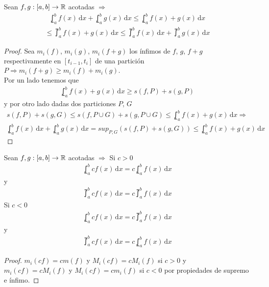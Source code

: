 \begin{prop}
  Sean \(f, g: [a, b] \to \mathbb{R}\) acotadas \(\Rightarrow\)
  \begin{align*}
    \lowint_a^b f(x)\,\mathrm{d}x + \lowint_a^b g(x)\,\mathrm{d}x \leq \lowint_a^b f(x)+g(x)\,\mathrm{d}x
  \end{align*}
  \begin{align*}
    \leq \upint_a^b f(x) + g(x)\, \mathrm{d}x \leq \upint_a^b f(x)\, \mathrm{d}x + \upint_a^b g(x)\, \mathrm{d}x
  \end{align*}
  \begin{proof}
    Sea \(m_i(f)\), \(m_i(g)\), \(m_i(f+g)\) los ínfimos de \(f\), \(g\), \(f+g\) respectivamente en \([t_{i-1}, t_i]\) de una partición \(P \Rightarrow m_i(f+g) \geq m_i(f) + m_i(g)\). \\
    Por un lado tenemos que \begin{align*}
      \lowint_a^b f(x)+g(x)\, \mathrm{d}x \geq s(f, P) + s(g, P)
    \end{align*} y por otro lado dadas dos particiones \(P\), \(G\) \begin{align*}
      s(f, P) + s(g, G) \leq s(f, P \cup G) + s(g, P \cup G) \leq \lowint_a^b f(x)+g(x)\,\mathrm{d}x \Rightarrow
    \end{align*}
    \begin{align*}
      \lowint_a^b f(x) \, \mathrm{d}x + \lowint_a^b g(x) \, \mathrm{d}x = sup_{P, G}(s(f, P)+s(g, G)) \leq \lowint_a^b f(x) + g(x)\, \mathrm{d}x
    \end{align*}
  \end{proof}
\end{prop}

\begin{prop}
  Sean \(f, g: [a, b] \to \mathbb{R}\) acotadas \(\Rightarrow\)
  Si \(c > 0\) \begin{align*}
    \lowint_a^b c f(x)\,\mathrm{d}x = c \lowint_a^b f(x)\,\mathrm{d}x
  \end{align*} y \begin{align*}
    \upint_a^b c f(x)\, \mathrm{d}x = c \upint_a^b f(x)\, \mathrm{d}x
  \end{align*}
  Si \(c < 0\) \begin{align*}
    \lowint_a^b c f(x)\,\mathrm{d}x = c \upint_a^b f(x)\,\mathrm{d}x
  \end{align*} y \begin{align*}
    \upint_a^b c f(x)\,\mathrm{d}x = c \lowint_a^b f(x)\,\mathrm{d}x
  \end{align*}
  \begin{proof}
    \(m_i(c f) = c m(f)\) y \(M_i(c f) = c M_i(f)\) si \(c > 0\) y \(m_i(c f) = c M_i(f)\) y \(M_i(c f) = c m_i(f)\) si \(c < 0\) por propiedades de supremo e ínfimo.
  \end{proof}
\end{prop}

